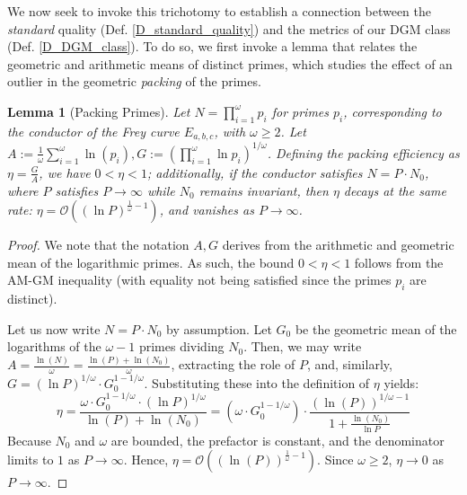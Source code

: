 \documentclass[11pt,letterpaper]{amsart}
\newtheorem{lemma}[theorem]{Lemma}
\def\ra{\rightarrow}
\begin{document}

We now seek to invoke this trichotomy to establish a connection between the \textit{standard} quality (Def. \ref{D_standard_quality}) and the metrics of our DGM class (Def. \ref{D_DGM_class}). To do so, we first invoke a lemma that relates the geometric and arithmetic means of distinct primes, which studies the effect of an outlier in the geometric \textit{packing} of the primes.

\begin{lemma}[Packing Primes]
\label{l_pack_primes}
Let $N = \prod_{i=1}^\omega p_i$ for primes $p_i$, corresponding to the conductor of the Frey curve $E_{a,b,c}$, with $\omega \ge 2$. Let $A := \frac{1}{\omega} \sum_{i = 1}^{\omega} \ln(p_i), G := \left( \prod_{i=1}^\omega \ln p_i \right)^{1/\omega}$. Defining the \emph{packing efficiency} as $\eta = \frac{G}{A}$, we have $0 < \eta < 1$; additionally, if the conductor satisfies $N = P \cdot N_0$, where $P$ satisfies $P \ra \infty$ while $N_0$ remains invariant, then $\eta$ decays at the same rate: $\eta = \mathcal{O}\left( (\ln P)^{\frac{1}{\omega} - 1} \right)$, and vanishes as $P \ra \infty$.
\end{lemma}

\begin{proof}
We note that the notation $A, G$ derives from the arithmetic and geometric mean of the logarithmic primes. As such, the bound $0 < \eta < 1$ follows from the AM-GM inequality (with equality not being satisfied since the primes $p_i$ are distinct).

Let us now write $N = P \cdot N_0$ by assumption. Let $G_0$ be the geometric mean of the logarithms of the $\omega - 1$ primes dividing $N_0$. Then, we may write $A = \frac{\ln(N)}{\omega} = \frac{\ln(P) + \ln(N_0)}{\omega}$, extracting the role of $P$, and, similarly, $G = (\ln P)^{1/\omega} \cdot G_0^{1 - 1/\omega}$. Substituting these into the definition of $\eta$ yields:
\[
    \eta = \frac{\omega \cdot G_0^{1 - 1/\omega} \cdot (\ln P)^{1/\omega}}{\ln (P) + \ln (N_0)} =  \left( \omega \cdot G_0^{1 - 1/\omega} \right) \cdot \frac{(\ln (P))^{1/\omega - 1}}{1 + \frac{\ln (N_0)}{\ln P}}
\]
Because $N_0$ and $\omega$ are bounded, the prefactor is constant, and the denominator limits to $1$ as $P \ra \infty$. Hence, $\eta = \mathcal{O}\left( (\ln( P))^{\frac{1}{\omega} - 1} \right)$. Since $\omega \ge 2$, $\eta \ra 0$ as $P \ra \infty$.
\end{proof}
\end{document}
